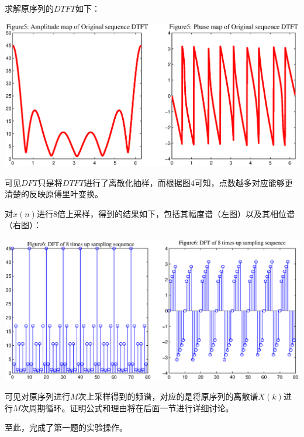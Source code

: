 \documentclass[a4paper,11pt,onecolumn,twoside]{article}
\begin{document}
求解原序列的$DTFT$如下：

\begin{center}
    \includegraphics[width=1\textwidth]{fig5.eps}
\end{center}
可见$DFT$只是将$DTFT$进行了离散化抽样，而根据图4可知，点数越多对应能够更清楚的反映原傅里叶变换。

对$x(n)$进行8倍上采样，得到的结果如下，包括其幅度谱（左图）以及其相位谱（右图）：
\begin{center}
    \includegraphics[width=1\textwidth]{fig6.eps}
\end{center}
可见对原序列进行$M$次上采样得到的频谱，对应的是将原序列的离散谱$X(k)$进行$M$次周期循环。证明公式和理由将在后面一节进行详细讨论。

至此，完成了第一题的实验操作。
\end{document}
